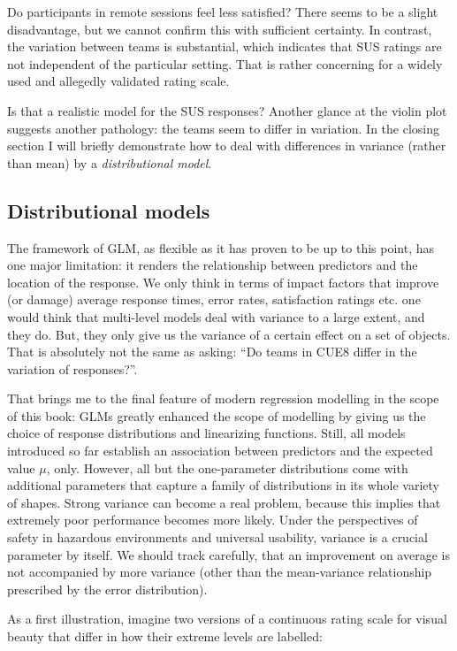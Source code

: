 \documentclass[]{svmono}
\begin{document}
Do participants in remote sessions feel less satisfied? There seems to
be a slight disadvantage, but we cannot confirm this with sufficient
certainty. In contrast, the variation between teams is substantial,
which indicates that SUS ratings are not independent of the particular
setting. That is rather concerning for a widely used and allegedly
validated rating scale.

Is that a realistic model for the SUS responses? Another glance at the
violin plot suggests another pathology: the teams seem to differ in
variation. In the closing section I will briefly demonstrate how to deal
with differences in variance (rather than mean) by a
\emph{distributional model}.

\subsection{Distributional models}\label{distributional-models}

The framework of GLM, as flexible as it has proven to be up to this
point, has one major limitation: it renders the relationship between
predictors and the location of the response. We only think in terms of
impact factors that improve (or damage) average response times, error
rates, satisfaction ratings etc. one would think that multi-level models
deal with variance to a large extent, and they do. But, they only give
us the variance of a certain effect on a set of objects. That is
absolutely not the same as asking: ``Do teams in CUE8 differ in the
variation of responses?''.

That brings me to the final feature of modern regression modelling in
the scope of this book: GLMs greatly enhanced the scope of modelling by
giving us the choice of response distributions and linearizing
functions. Still, all models introduced so far establish an association
between predictors and the expected value \(\mu\), only. However, all
but the one-parameter distributions come with additional parameters that
capture a family of distributions in its whole variety of shapes. Strong
variance can become a real problem, because this implies that extremely
poor performance becomes more likely. Under the perspectives of safety
in hazardous environments and universal usability, variance is a crucial
parameter by itself. We should track carefully, that an improvement on
average is not accompanied by more variance (other than the
mean-variance relationship prescribed by the error distribution).

As a first illustration, imagine two versions of a continuous rating
scale for visual beauty that differ in how their extreme levels are
labelled:
\end{document}
